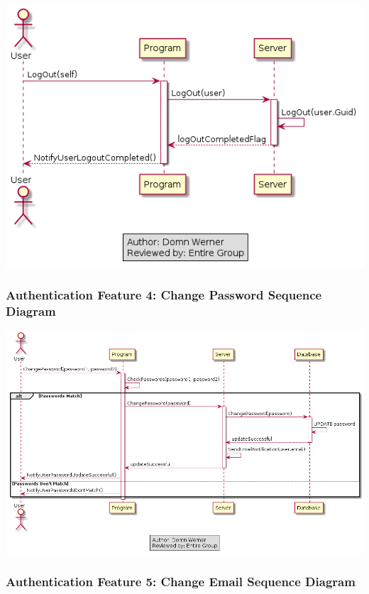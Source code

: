 \documentclass[twoside,letterpaper]{article}
\begin{document}
	\bigskip
	
	\includegraphics[width=6.0in]{images/SequenceDiagrams/AuthenticationLogOut}
	
	\newpage
	
	\subsubsection[Authentication Feature 4: Change Password Sequence Diagram]{\rmfamily\bfseries\color{black}
		Authentication Feature 4: Change Password Sequence Diagram}
	\hypertarget{RefHeading22059017292}{}
	\label{a:sd4}
	\bigskip
	
	\includegraphics[width=6.0in]{images/SequenceDiagrams/AuthenticationChangePassword}
	
	
	\newpage
	
	
	\subsubsection[Authentication Feature 5: Change Email Sequence Diagram]{\rmfamily\bfseries\color{black}
		Authentication Feature 5: Change Email Sequence Diagram}
	\hypertarget{RefHeading22059017292}{}
	\label{a:sd5}
	\bigskip
	
\end{document}
